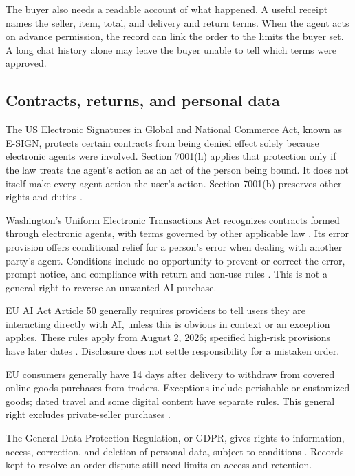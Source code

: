 \documentclass{article}
\begin{document}
The buyer also needs a readable account of what happened. A useful receipt names the seller, item, total, and delivery and return terms. When the agent acts on advance permission, the record can link the order to the limits the buyer set. A long chat history alone may leave the buyer unable to tell which terms were approved.

\subsection{Contracts, returns, and personal data}

The US Electronic Signatures in Global and National Commerce Act, known as E-SIGN, protects certain contracts from being denied effect solely because electronic agents were involved. Section 7001(h) applies that protection only if the law treats the agent's action as an act of the person being bound. It does not itself make every agent action the user's action. Section 7001(b) preserves other rights and duties \cite{ref22}.

Washington's Uniform Electronic Transactions Act recognizes contracts formed through electronic agents, with terms governed by other applicable law \cite{ref23}. Its error provision offers conditional relief for a person's error when dealing with another party's agent. Conditions include no opportunity to prevent or correct the error, prompt notice, and compliance with return and non-use rules \cite{ref24}. This is not a general right to reverse an unwanted AI purchase.

EU AI Act Article 50 generally requires providers to tell users they are interacting directly with AI, unless this is obvious in context or an exception applies. These rules apply from August 2, 2026; specified high-risk provisions have later dates \cite{ref25,ref26}. Disclosure does not settle responsibility for a mistaken order.

EU consumers generally have 14 days after delivery to withdraw from covered online goods purchases from traders. Exceptions include perishable or customized goods; dated travel and some digital content have separate rules. This general right excludes private-seller purchases \cite{ref27}.

The General Data Protection Regulation, or GDPR, gives rights to information, access, correction, and deletion of personal data, subject to conditions \cite{ref28}. Records kept to resolve an order dispute still need limits on access and retention.
\end{document}
